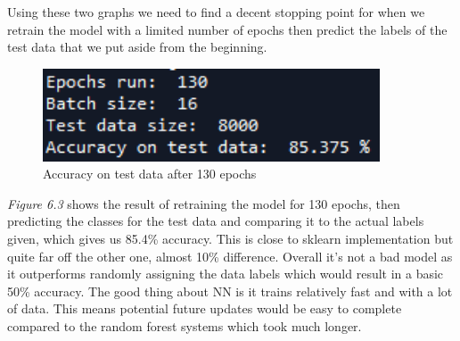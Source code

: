 Using these two graphs we need to find a decent stopping point for when we retrain the model with a limited number of epochs then predict the labels of the test data that we put aside from the beginning. 

\begin{figure}[!h]
\centering
\includegraphics[width=100mm]{figures/nntestpredict}
\caption{Accuracy on test data after 130 epochs}
\end{figure}

\textit{Figure 6.3} shows the result of retraining the model for 130 epochs, then predicting the classes for the test data and comparing it to the actual labels given, which gives us 85.4\% accuracy. This is close to sklearn implementation but quite far off the other one, almost 10\% difference. Overall it's not a bad model as it outperforms randomly assigning the data labels which would result in a basic 50\% accuracy. The good thing about NN is it trains relatively fast and with a lot of data. This means potential future updates would be easy to complete compared to the random forest systems which took much longer. 




